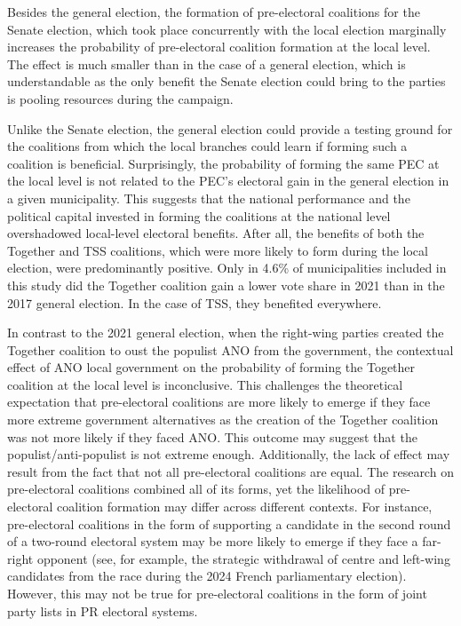 \documentclass[]{interact}
\theoremstyle{plain}%
\theoremstyle{definition}
\theoremstyle{remark}
\begin{document}
Besides the general election, the formation of pre-electoral coalitions for the Senate election, which took place concurrently with the local election marginally increases the probability of pre-electoral coalition formation at the local level. The effect is much smaller than in the case of a general election, which is understandable as the only benefit the Senate election could bring to the parties is pooling resources during the campaign.

Unlike the Senate election, the general election could provide a testing ground for the coalitions from which the local branches could learn if forming such a coalition is beneficial. Surprisingly, the probability of forming the same PEC at the local level is not related to the PEC's electoral gain in the general election in a given municipality. This suggests that the national performance and the political capital invested in forming the coalitions at the national level overshadowed local-level electoral benefits. After all, the benefits of both the Together and TSS coalitions, which were more likely to form during the local election, were predominantly positive. Only in 4.6\% of municipalities included in this study did the Together coalition gain a lower vote share in 2021 than in the 2017 general election. In the case of TSS, they benefited everywhere.

In contrast to the 2021 general election, when the right-wing parties created the Together coalition to oust the populist ANO from the government, the contextual effect of ANO local government on the probability of forming the Together coalition at the local level is inconclusive. This challenges the theoretical expectation that pre-electoral coalitions are more likely to emerge if they face more extreme government alternatives as the creation of the Together coalition was not more likely if they faced ANO. This outcome may suggest that the populist/anti-populist is not extreme enough. Additionally, the lack of effect may result from the fact that not all pre-electoral coalitions are equal. The research on pre-electoral coalitions combined all of its forms, yet the likelihood of pre-electoral coalition formation may differ across different contexts. For instance, pre-electoral coalitions in the form of supporting a candidate in the second round of a two-round electoral system may be more likely to emerge if they face a far-right opponent (see, for example, the strategic withdrawal of centre and left-wing candidates from the race during the 2024 French parliamentary election). However, this may not be true for pre-electoral coalitions in the form of joint party lists in PR electoral systems. 
\end{document}
